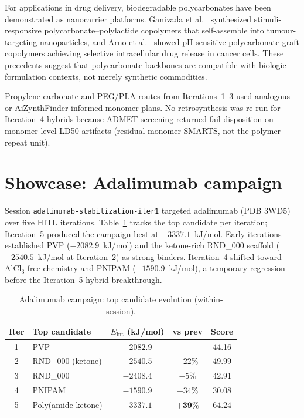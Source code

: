 \documentclass[twocolumn]{fairmeta}
\begin{document}
For applications in drug delivery, biodegradable polycarbonates have been demonstrated as nanocarrier platforms.
Ganivada et al.~\cite{ganivada2016polycarbonate} synthesized stimuli-responsive polycarbonate--polylactide copolymers that self-assemble into tumour-targeting nanoparticles, and Arno et al.~\cite{arno2022polycarbonate} showed pH-sensitive polycarbonate graft copolymers achieving selective intracellular drug release in cancer cells.
These precedents suggest that polycarbonate backbones are compatible with biologic formulation contexts, not merely synthetic commodities.

Propylene carbonate and PEG/PLA routes from Iterations~1--3 used analogous or AiZynthFinder-informed monomer plans.
No retrosynthesis was re-run for Iteration~4 hybrids because ADMET screening returned fail disposition on monomer-level LD50 artifacts (residual monomer SMARTS, not the polymer repeat unit).

\section{Showcase: Adalimumab campaign}
\label{sec:adalimumab}

Session \texttt{adalimumab-stabilization-iter1} targeted adalimumab (PDB 3WD5) over five HITL iterations.
Table~\ref{tab:ada_evolution} tracks the top candidate per iteration; Iteration~5 produced the campaign best at $-3337.1$~kJ/mol.
Early iterations established PVP ($-2082.9$~kJ/mol) and the ketone-rich RND\_000 scaffold ($-2540.5$~kJ/mol at Iteration~2) as strong binders.
Iteration~4 shifted toward AlCl$_3$-free chemistry and PNIPAM ($-1590.9$~kJ/mol), a temporary regression before the Iteration~5 hybrid breakthrough.

\begin{table}[t]
\centering
\caption{Adalimumab campaign: top candidate evolution (within-session).}
\label{tab:ada_evolution}
\small
\begin{tabularx}{\columnwidth}{cXccc}
\toprule
Iter & Top candidate & $E_\text{int}$ (kJ/mol) & vs prev & Score \\
\midrule
1 & PVP & $-2082.9$ & -- & 44.16 \\
2 & RND\_000 (ketone) & $-2540.5$ & $+22\%$ & 49.99 \\
3 & RND\_000 & $-2408.4$ & $-5\%$ & 42.91 \\
4 & PNIPAM & $-1590.9$ & $-34\%$ & 30.08 \\
5 & Poly(amide-ketone) & $\mathbf{-3337.1}$ & $\mathbf{+39\%}$ & $\mathbf{64.24}$ \\
\bottomrule
\end{tabularx}
\end{table}
\end{document}
